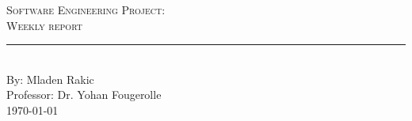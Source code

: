 \documentclass[aps,letterpaper,11pt]{revtex4}
\newcommand{\labno}{Software Engineering Project}
\newcommand{\labtitle}{Weekly report}
\newcommand{\authorname}{Mladen Rakic}
\newcommand{\professor}{Dr. Yohan Fougerolle}
\begin{document}
  
\begin{titlepage}
\begin{center}
{\LARGE \textsc{\labno:} \\ \vspace{4pt}}
{\Large \textsc{\labtitle} \\ \vspace{4pt}} 
\rule[13pt]{\textwidth}{1pt} \\ \vspace{150pt}
{\large By: \authorname \\ \vspace{10pt}
Professor: \professor \\ \vspace{10pt}
\today}
\end{center}


\end{titlepage}%
\newpage
\end{document}
